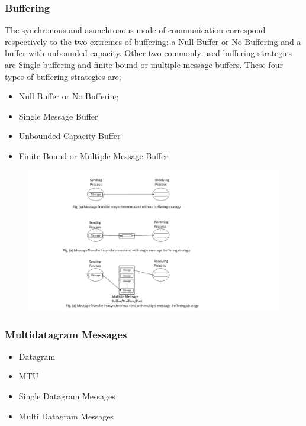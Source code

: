 \documentclass{beamer}
\begin{document}
\begin{frame}[allowframebreaks]
	\frametitle{Buffering}
	The synchronous and asunchronous mode of communication correspond respectively to the 
	two extremes of buffering: a Null Buffer or No Buffering and a buffer with unbounded 
	capacity. Other two commonly used buffering strategies are Single-buffering and finite 
	bound or multiple message buffers. These four types of buffering strategies are;
	\begin{itemize}
		\item Null Buffer or No Buffering
		\item Single Message Buffer
		\item Unbounded-Capacity Buffer
		\item Finite Bound or Multiple Message Buffer
	\end{itemize}
	\vspace{1.5cm}		
	\framebreak
	\begin{figure}
		\centering
		\includegraphics[width=15cm]{buffering.jpg}
	\end{figure}
	\vspace{1cm}
\end{frame}

\begin{frame}
	\frametitle{Multidatagram Messages}
	\begin{itemize}
		\item Datagram
		\item MTU
		\item Single Datagram Messages
		\item Multi Datagram Messages
	\end{itemize}
	\vspace{4cm}
\end{frame}
\end{document}
